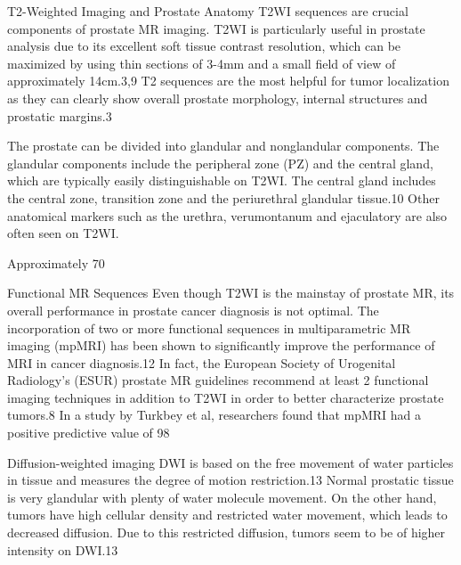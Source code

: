 T2-Weighted Imaging and Prostate Anatomy
T2WI sequences are crucial components of prostate MR imaging.  T2WI is particularly useful in prostate analysis due to its excellent soft tissue contrast resolution, which can be maximized by using thin sections of 3-4mm and a small field of view of approximately 14cm.3,9 T2 sequences are the most helpful for tumor localization as they can clearly show overall prostate morphology, internal structures and prostatic margins.3

The prostate can be divided into glandular and nonglandular components. The glandular components include the peripheral zone (PZ) and the central gland, which are typically easily distinguishable on T2WI. The central gland includes the central zone, transition zone and the periurethral glandular tissue.10 Other anatomical markers such as the urethra, verumontanum and ejaculatory are also often seen on T2WI. 

Approximately 70%

Functional MR Sequences
Even though T2WI is the mainstay of prostate MR, its overall performance in prostate cancer diagnosis is not optimal. The incorporation of two or more functional sequences in multiparametric MR imaging (mpMRI) has been shown to significantly improve the performance of MRI in cancer diagnosis.12 In fact, the European Society of Urogenital Radiology’s (ESUR) prostate MR guidelines recommend at least 2 functional imaging techniques in addition to T2WI in order to better characterize prostate tumors.8 In a study by Turkbey et al, researchers found that mpMRI had a positive predictive value of 98%

Diffusion-weighted imaging
DWI is based on the free movement of water particles in tissue and measures the degree of motion restriction.13 Normal prostatic tissue is very glandular with plenty of water molecule movement. On the other hand, tumors have high cellular density and restricted water movement, which leads to decreased diffusion. Due to this restricted diffusion, tumors seem to be of higher intensity on DWI.13

